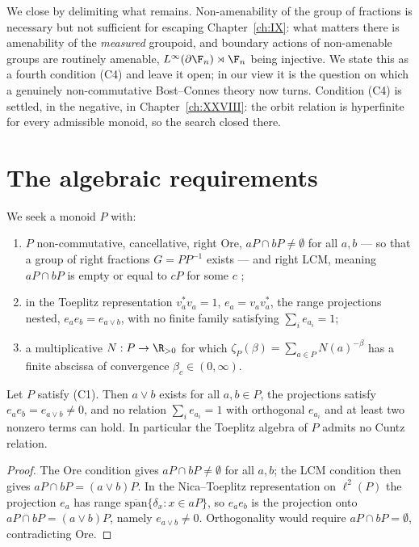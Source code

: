 \begin{summary}
We close by delimiting what remains. Non-amenability of the group of fractions is necessary
but not sufficient for escaping Chapter~\ref{ch:IX}: what matters there is amenability of the
\emph{measured} groupoid, and boundary actions of non-amenable groups are routinely amenable,
$L^\infty(\partial\F_n)\rtimes\F_n$ being injective. We state this as a fourth condition
(C4) and leave it open; in our view it is the question on which a genuinely non-commutative
Bost--Connes theory now turns.
Condition (C4) is settled, in the negative, in Chapter~\ref{ch:XXVIII}: the orbit
relation is hyperfinite for every admissible monoid, so the search closed there.
\end{summary}


\section{The algebraic requirements}

\begin{definition}\label{X:def:target}
We seek a monoid $P$ with:
\begin{enumerate}
\item[(C1)] $P$ non-commutative, cancellative, right Ore, $aP\cap bP\ne\emptyset$ for all
$a,b$ --- so that a group of right fractions $G=PP^{-1}$ exists --- and right LCM, meaning
$aP\cap bP$ is empty or equal to $cP$ for some $c$ \cite{Nica,LacaRaeburn};
\item[(C2)] in the Toeplitz representation $v_a^*v_a=1$, $e_a=v_av_a^*$, the range
projections nested, $e_ae_b=e_{a\vee b}$, with no finite family satisfying
$\sum_ie_{a_i}=1$;
\item[(C3)] a multiplicative $N:P\to\R_{>0}$ for which
$\zeta_P(\beta)=\sum_{a\in P}N(a)^{-\beta}$ has a finite abscissa of convergence
$\beta_c\in(0,\infty)$.
\end{enumerate}
\end{definition}

\begin{proposition}\label{X:prop:C2}
Let $P$ satisfy (C1). Then $a\vee b$ exists for all $a,b\in P$, the projections satisfy
$e_ae_b=e_{a\vee b}\ne0$, and no relation $\sum_ie_{a_i}=1$ with orthogonal $e_{a_i}$ and at
least two nonzero terms can hold. In particular the Toeplitz algebra of $P$ admits no Cuntz
relation.
\end{proposition}

\begin{proof}
The Ore condition gives $aP\cap bP\ne\emptyset$ for all $a,b$; the LCM condition then gives
$aP\cap bP=(a\vee b)P$. In the Nica--Toeplitz representation on $\ell^2(P)$ the projection
$e_a$ has range $\overline{\mathrm{span}}\{\delta_x:x\in aP\}$, so $e_ae_b$ is the projection
onto $aP\cap bP=(a\vee b)P$, namely $e_{a\vee b}\ne0$. Orthogonality would require
$aP\cap bP=\emptyset$, contradicting Ore.
\end{proof}


